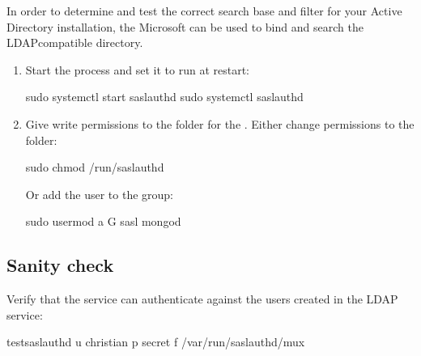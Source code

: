 \documentclass[letterpaper,10pt,english]{sphinxmanual}
\begin{document}
\sphinxAtStartPar
In order to determine and test the correct search base
and filter for your Active Directory installation,
the Microsoft 
can be used to bind and search the LDAP\sphinxhyphen{}compatible directory.
\begin{enumerate}
%
\setcounter{enumi}{3}
\item {} 
\sphinxAtStartPar
Start the  process and set it to run at restart:

\begin{sphinxVerbatim}[commandchars=\\\{\}]
\PYGZdl{} sudo systemctl start saslauthd
\PYGZdl{} sudo systemctl  saslauthd
\end{sphinxVerbatim}

\item {} 
\sphinxAtStartPar
Give write permissions to the  folder for the . Either change permissions to the   folder:

\begin{sphinxVerbatim}[commandchars=\\\{\}]
\PYGZdl{} sudo chmod  /run/saslauthd
\end{sphinxVerbatim}

\sphinxAtStartPar
Or add the  user to the  group:

\begin{sphinxVerbatim}[commandchars=\\\{\}]
\PYGZdl{} sudo usermod \PYGZhy{}a \PYGZhy{}G sasl mongod
\end{sphinxVerbatim}

\end{enumerate}


\subsection{Sanity check}
\label{\detokenize{sasl-auth:sanity-check}}
\sphinxAtStartPar
Verify that the  service can authenticate
against the users created in the LDAP service:

\begin{sphinxVerbatim}[commandchars=\\\{\}]
\PYGZdl{} testsaslauthd \PYGZhy{}u christian \PYGZhy{}p secret  \PYGZhy{}f /var/run/saslauthd/mux
\end{sphinxVerbatim}
\end{document}
